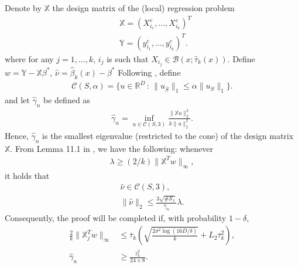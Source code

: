 Denote by $\mathbb X$ the design matrix of the (local) regression problem 
\begin{align*}
&\mathbb X = ( X_{i_1}^c , \ldots, X_{i_k}^c )^T \\
&\mathbb Y = (y_{i_1}^c, \ldots , y_{i_k}^c)^T.
\end{align*}
 where for any $j=1,\ldots, k$, $i_j$ is such that $X_{i_j}\in \mathcal B(x;\hat \tau_k(x))$. Define  $ w = \mathbb Y- \mathbb X \beta^*$,  $\hat \nu = \hat \beta_k(x) -\beta^*$
Following \cite{hastieStatisticalLearningSparsity2015}, define
\begin{align*}
\mathcal C(S,\alpha) = \{u\in \mathbb R^D \, : \,  \|u_{\overline S}\|_1 \leq \alpha \|u_{S}\|_1\}. 
\end{align*}
and let $\hat \gamma_n$ be defined as
\begin{align*}
\hat \gamma_n = \inf _ {u\in \mathcal C(S,3)} \frac{ \|   \mathbb X u \|_2^2}{k\|u\|_2^2}  .
\end{align*}
Hence,  $\hat \gamma_n $ is the smallest eigenvalue (restricted to the cone) of the design matrix $\mathbb X$. From Lemma 11.1 in \cite{hastieStatisticalLearningSparsity2015}, we have the following:
whenever
\begin{align*}
\lambda \geq (2 / k) \| \mathbb X^T w\|_\infty,
\end{align*}
it holds that
\begin{gather*}
\hat \nu  \in \mathcal C(S,3),\\
\| \hat \nu\|_2  \leq \frac{3\sqrt {\#\mathcal S_x}  }{   \hat \gamma_n}  \lambda.
\end{gather*}
Consequently, the proof will be completed if,  with probability $1-\delta$,
\begin{align}
\label{eq:bound_Xw} \frac{2}{k} \lVert  \mathbb X^T_j w \rVert_\infty &\leq    \overline \tau_k   \left( \sqrt{ \frac{2  \sigma^2   \log(16D/\delta) }{k} } +  L_2 \overline \tau_k  ^2\right),\\
\label{eq:bound_gamma} \hat \gamma_n  &\geq   \frac { \overline \tau_k  ^{2 }    }{24\times 8  } .
\end{align}

